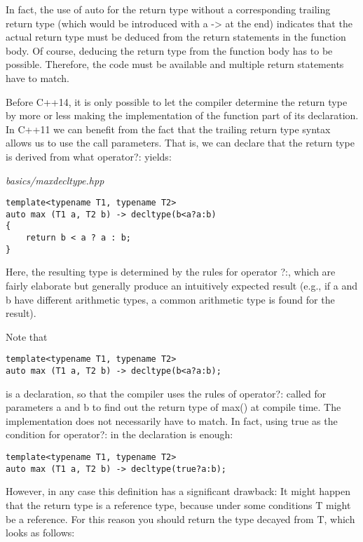 In fact, the use of auto for the return type without a corresponding trailing return type (which would be introduced with a -> at the end) indicates that the actual return type must be deduced from the return statements in the function body. Of course, deducing the return type from the function body has to be possible. Therefore, the code must be available and multiple return statements have to match.

Before C++14, it is only possible to let the compiler determine the return type by more or less making the implementation of the function part of its declaration. In C++11 we can benefit from the fact that the trailing return type syntax allows us to use the call parameters. That is, we can declare that the return type is derived from what operator?: yields:

\noindent
\textit{basics/maxdecltype.hpp}
\begin{lstlisting}[style=styleCXX]
template<typename T1, typename T2>
auto max (T1 a, T2 b) -> decltype(b<a?a:b)
{
	return b < a ? a : b;
}
\end{lstlisting}

Here, the resulting type is determined by the rules for operator ?:, which are fairly elaborate but generally produce an intuitively expected result (e.g., if a and b have different arithmetic types, a common arithmetic type is found for the result).

Note that

\begin{lstlisting}[style=styleCXX]
template<typename T1, typename T2>
auto max (T1 a, T2 b) -> decltype(b<a?a:b);
\end{lstlisting}

is a declaration, so that the compiler uses the rules of operator?: called for parameters a and b to find out the return type of max() at compile time. The implementation does not necessarily have to match. In fact, using true as the condition for operator?: in the declaration is enough:

\begin{lstlisting}[style=styleCXX]
template<typename T1, typename T2>
auto max (T1 a, T2 b) -> decltype(true?a:b);
\end{lstlisting}

However, in any case this definition has a significant drawback: It might happen that the return type is a reference type, because under some conditions T might be a reference. For this reason you should return the type decayed from T, which looks as follows:

